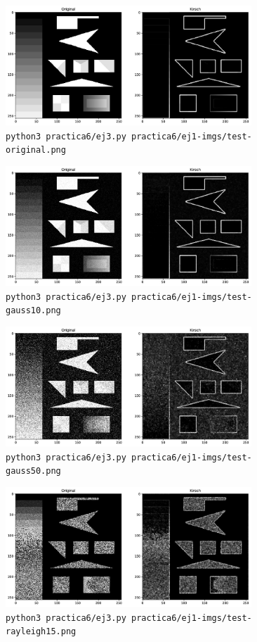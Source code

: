 \documentclass[11pt, spanish]{article}
\begin{document}
\begin{figure}[H]
\centering
    \includegraphics[height=4.5cm]{informe-imgs/ej3--test-original.jpg}
    \caption{\texttt{python3 practica6/ej3.py practica6/ej1-imgs/test-original.png }}
\end{figure}

\begin{figure}[H]
\centering
    \includegraphics[height=4.5cm]{informe-imgs/ej3--test-gauss10.jpg}
    \caption{\texttt{python3 practica6/ej3.py practica6/ej1-imgs/test-gauss10.png }}
\end{figure}

\begin{figure}[H]
\centering
    \includegraphics[height=4.5cm]{informe-imgs/ej3--test-gauss50.jpg}
    \caption{\texttt{python3 practica6/ej3.py practica6/ej1-imgs/test-gauss50.png }}
\end{figure}

\begin{figure}[H]
\centering
    \includegraphics[height=4.5cm]{informe-imgs/ej3--test-rayleigh15.jpg}
    \caption{\texttt{python3 practica6/ej3.py practica6/ej1-imgs/test-rayleigh15.png }}
\end{figure}
\end{document}
